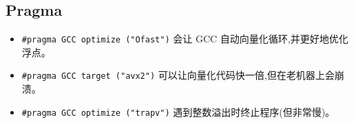 	\subsection{Pragma}
		\begin{itemize}
			\item \lstinline{#pragma GCC optimize ("Ofast")} 会让 GCC 自动向量化循环,并更好地优化浮点。
			\item \lstinline{#pragma GCC target ("avx2")} 可以让向量化代码快一倍,但在老机器上会崩溃。
			\item \lstinline{#pragma GCC optimize ("trapv")} 遇到整数溢出时终止程序(但非常慢)。
		\end{itemize}

